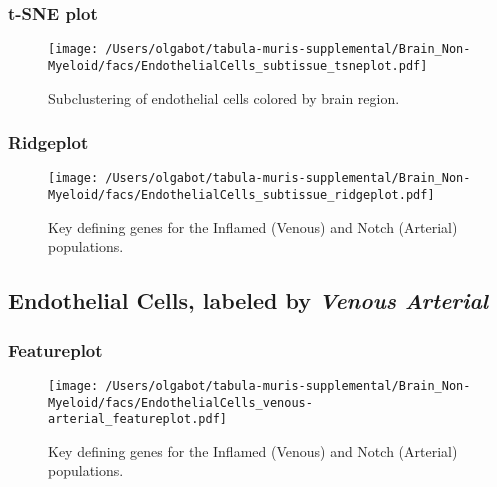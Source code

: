 \clearpage
\subsubsection{t-SNE plot}
\begin{figure}[h]
\centering
\texttt{[image: /Users/olgabot/tabula-muris-supplemental/Brain\_Non-Myeloid/facs/EndothelialCells\_subtissue\_tsneplot.pdf]}

\caption{Subclustering of endothelial cells colored by brain region.
}
\end{figure}


\clearpage

\subsubsection{Ridgeplot}
\begin{figure}[h]
\centering
\texttt{[image: /Users/olgabot/tabula-muris-supplemental/Brain\_Non-Myeloid/facs/EndothelialCells\_subtissue\_ridgeplot.pdf]}

\caption{Key defining genes for the Inflamed (Venous) and Notch (Arterial) populations.
}
\end{figure}


\clearpage

\subsection{Endothelial Cells, labeled by \emph{Venous Arterial}}

\clearpage
\subsubsection{Featureplot}
\begin{figure}[h]
\centering
\texttt{[image: /Users/olgabot/tabula-muris-supplemental/Brain\_Non-Myeloid/facs/EndothelialCells\_venous-arterial\_featureplot.pdf]}

\caption{Key defining genes for the Inflamed (Venous) and Notch (Arterial) populations.
}
\end{figure}

